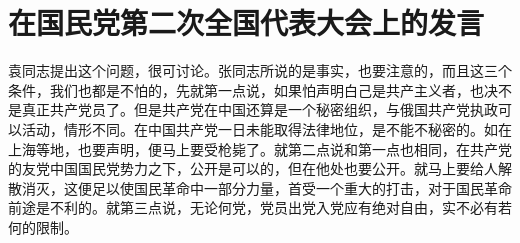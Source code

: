 \section[在国民党第二次全国代表大会上的发言（一九二五年）]{在国民党第二次全国代表大会上的发言}


袁同志提出这个问题，很可讨论。张同志所说的是事实，也要注意的，而且这三个条件，我们也都是不怕的，先就第一点说，如果怕声明白己是共产主义者，也决不是真正共产党员了。但是共产党在中国还算是一个秘密组织，与俄国共产党执政可以活动，情形不同。在中国共产党一日未能取得法律地位，是不能不秘密的。如在上海等地，也要声明，便马上要受枪毙了。就第二点说和第一点也相同，在共产党的友党中国国民党势力之下，公开是可以的，但在他处也要公开。就马上要给人解散消灭，这便足以使国民革命中一部分力量，首受一个重大的打击，对于国民革命前途是不利的。就第三点说，无论何党，党员出党入党应有绝对自由，实不必有若何的限制。

